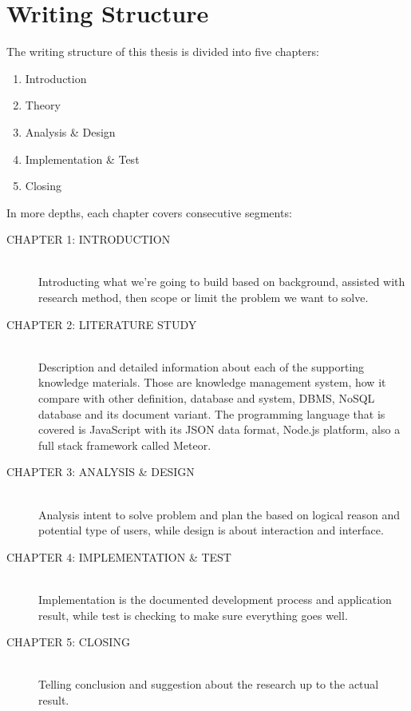 \section{Writing Structure}
\label{sec:writing-structure}

The writing structure of this thesis is divided into five chapters:

\begin{enumerate}
\item Introduction
\item Theory
\item Analysis \& Design
\item Implementation \& Test
\item Closing
\end{enumerate}

\noindent In more depths, each chapter covers consecutive segments:

\begin{description}
\item [CHAPTER 1: INTRODUCTION] \hfill \\
Introducting what we're going to build based on background, assisted with research method, then scope or limit the problem we want to solve.
\item [CHAPTER 2: LITERATURE STUDY] \hfill \\
Description and detailed information about each of the supporting knowledge materials. Those are knowledge management system, how it compare with other definition, database and system, \ac{DBMS}, \ac{NoSQL} database and its document variant. The programming language that is covered is JavaScript with its \ac{JSON} data format, Node.js platform, also a full stack framework called Meteor.
\item [CHAPTER 3: ANALYSIS \& DESIGN] \hfill \\
Analysis intent to solve problem and plan the based on logical reason and potential type of users, while design is about interaction and interface.
\item [CHAPTER 4: IMPLEMENTATION \& TEST] \hfill \\
Implementation is the documented development process and application result, while test is checking to make sure everything goes well.
\item [CHAPTER 5: CLOSING] \hfill \\
Telling conclusion and suggestion about the research up to the actual result.
\end{description}
